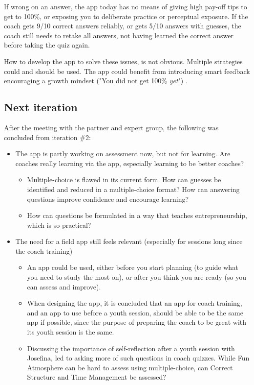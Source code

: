 If wrong on an answer, the app today has no means of giving high pay-off tips to get to 100\%, or exposing you to deliberate practice or perceptual exposure. If the coach gets 9/10 correct answers reliably, or gets 5/10 answers with guesses, the coach still needs to retake all answers, not having learned the correct answer before taking the quiz again.

How to develop the app to solve these issues, is not obvious. Multiple strategies could and should be used. The app could benefit from introducing smart feedback encouraging a growth mindset ("You did not get 100\% \textit{yet}") \cite{dweck}.

\subsection{Next iteration}
After the meeting with the partner and expert group, the following was concluded from iteration \#2:

\begin{itemize}
\item The app is partly working on assessment now, but not for learning. Are coaches really learning via the app, especially learning to be better coaches?
  \begin{itemize}
    \item Multiple-choice is flawed in its current form. How can guesses be identified and reduced in a multiple-choice format? How can answering questions improve confidence and encourage learning?
    \item How can questions be formulated in a way that teaches entrepreneurship, which is so practical?
  \end{itemize}
\item The need for a field app still feels relevant (especially for sessions long since the coach training)
  \begin{itemize}
    \item An app could be used, either before you start planning (to guide what you need to study the most on), or after you think you are ready (so you can assess and improve).
    \item When designing the app, it is concluded that an app for coach training, and an app to use before a youth session, should be able to be the same app if possible, since the purpose of preparing the coach to be great with its youth session is the same.
    \item Discussing the importance of self-reflection after a youth session with Josefina, led to asking more of such questions in coach quizzes. While Fun Atmosphere can be hard to assess using multiple-choice, can Correct Structure and Time Management be assessed?
  \end{itemize}
\end{itemize}

